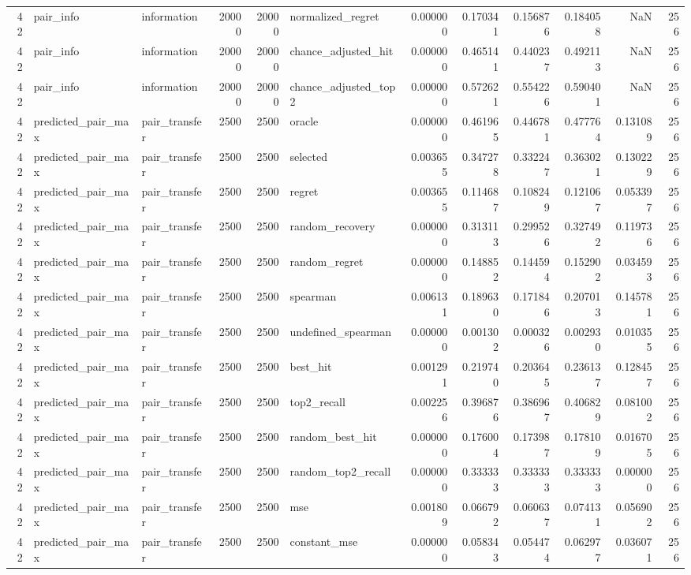 \begin{tabular}{rllrrlrrrrrr}
42 & pair_info & information & 20000 & 20000 & normalized_regret & 0.000000 & 0.170341 & 0.156876 & 0.184058 & NaN & 256 \\
42 & pair_info & information & 20000 & 20000 & chance_adjusted_hit & 0.000000 & 0.465141 & 0.440237 & 0.492113 & NaN & 256 \\
42 & pair_info & information & 20000 & 20000 & chance_adjusted_top2 & 0.000000 & 0.572621 & 0.554226 & 0.590401 & NaN & 256 \\
42 & predicted_pair_max & pair_transfer & 2500 & 2500 & oracle & 0.000000 & 0.461965 & 0.446781 & 0.477764 & 0.131089 & 256 \\
42 & predicted_pair_max & pair_transfer & 2500 & 2500 & selected & 0.003655 & 0.347278 & 0.332247 & 0.363021 & 0.130229 & 256 \\
42 & predicted_pair_max & pair_transfer & 2500 & 2500 & regret & 0.003655 & 0.114687 & 0.108249 & 0.121067 & 0.053397 & 256 \\
42 & predicted_pair_max & pair_transfer & 2500 & 2500 & random_recovery & 0.000000 & 0.313113 & 0.299526 & 0.327492 & 0.119736 & 256 \\
42 & predicted_pair_max & pair_transfer & 2500 & 2500 & random_regret & 0.000000 & 0.148852 & 0.144594 & 0.152902 & 0.034593 & 256 \\
42 & predicted_pair_max & pair_transfer & 2500 & 2500 & spearman & 0.006131 & 0.189630 & 0.171846 & 0.207013 & 0.145781 & 256 \\
42 & predicted_pair_max & pair_transfer & 2500 & 2500 & undefined_spearman & 0.000000 & 0.001302 & 0.000326 & 0.002930 & 0.010355 & 256 \\
42 & predicted_pair_max & pair_transfer & 2500 & 2500 & best_hit & 0.001291 & 0.219740 & 0.203645 & 0.236137 & 0.128457 & 256 \\
42 & predicted_pair_max & pair_transfer & 2500 & 2500 & top2_recall & 0.002256 & 0.396876 & 0.386967 & 0.406829 & 0.081002 & 256 \\
42 & predicted_pair_max & pair_transfer & 2500 & 2500 & random_best_hit & 0.000000 & 0.176004 & 0.173987 & 0.178109 & 0.016705 & 256 \\
42 & predicted_pair_max & pair_transfer & 2500 & 2500 & random_top2_recall & 0.000000 & 0.333333 & 0.333333 & 0.333333 & 0.000000 & 256 \\
42 & predicted_pair_max & pair_transfer & 2500 & 2500 & mse & 0.001809 & 0.066792 & 0.060637 & 0.074131 & 0.056902 & 256 \\
42 & predicted_pair_max & pair_transfer & 2500 & 2500 & constant_mse & 0.000000 & 0.058343 & 0.054474 & 0.062977 & 0.036071 & 256 \\

\end{tabular}
